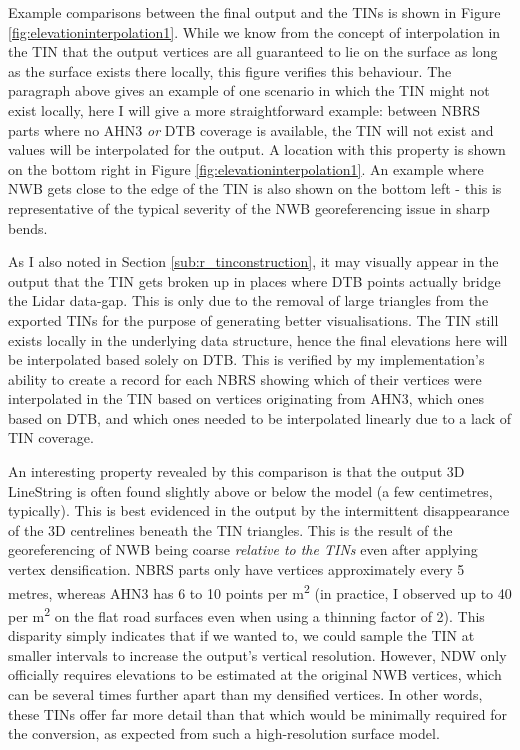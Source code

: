 Example comparisons between the final output and the TINs is shown in Figure \ref{fig:elevationinterpolation1}. While we know from the concept of interpolation in the TIN that the output vertices are all guaranteed to lie on the surface as long as the surface exists there locally, this figure verifies this behaviour. The paragraph above gives an example of one scenario in which the TIN might not exist locally, here I will give a more straightforward example: between NBRS parts where no AHN3 \textit{or} DTB coverage is available, the TIN will not exist and values will be interpolated for the output. A location with this property is shown on the bottom right in Figure \ref{fig:elevationinterpolation1}. An example where NWB gets close to the edge of the TIN is also shown on the bottom left - this is representative of the typical severity of the NWB georeferencing issue in sharp bends.

As I also noted in Section \ref{sub:r_tinconstruction}, it may visually appear in the output that the TIN gets broken up in places where DTB points actually bridge the Lidar data-gap. This is only due to the removal of large triangles from the exported TINs for the purpose of generating better visualisations. The TIN still exists locally in the underlying data structure, hence the final elevations here will be interpolated based solely on DTB. This is verified by my implementation's ability to create a record for each NBRS showing which of their vertices were interpolated in  the TIN based on vertices originating from AHN3, which ones based on DTB, and which ones needed to be interpolated linearly due to a lack of TIN coverage.

An interesting property revealed by this comparison is that the output 3D LineString is often found slightly above or below the model (a few centimetres, typically). This is best evidenced in the output by the intermittent disappearance of the 3D centrelines beneath the TIN triangles. This is the result of the georeferencing of NWB being coarse \textit{relative to the TINs} even after applying vertex densification. NBRS parts only have vertices approximately every 5 metres, whereas AHN3 has 6 to 10 points per m\textsuperscript{2} (in practice, I observed up to 40 per m\textsuperscript{2} on the flat road surfaces even when using a thinning factor of 2). This disparity simply indicates that if we wanted to, we could sample the TIN at smaller intervals to increase the output's vertical resolution. However, NDW only officially requires elevations to be estimated at the original NWB vertices, which can be several times further apart than my densified vertices. In other words, these TINs offer far more detail than that which would be minimally required for the conversion, as expected from such a high-resolution surface model.

